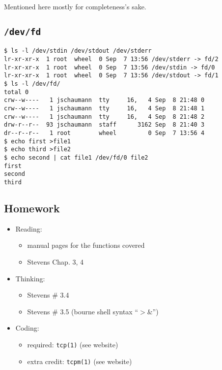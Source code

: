 \documentclass[xga]{xdvislides}
\begin{document}
Mentioned here mostly for completeness's sake.

\subsection{{\tt /dev/fd}}
\begin{verbatim}
$ ls -l /dev/stdin /dev/stdout /dev/stderr
lr-xr-xr-x  1 root  wheel  0 Sep  7 13:56 /dev/stderr -> fd/2
lr-xr-xr-x  1 root  wheel  0 Sep  7 13:56 /dev/stdin -> fd/0
lr-xr-xr-x  1 root  wheel  0 Sep  7 13:56 /dev/stdout -> fd/1
$ ls -l /dev/fd/
total 0
crw--w----   1 jschaumann  tty     16,   4 Sep  8 21:48 0
crw--w----   1 jschaumann  tty     16,   4 Sep  8 21:48 1
crw--w----   1 jschaumann  tty     16,   4 Sep  8 21:48 2
drw-r--r--  93 jschaumann  staff      3162 Sep  8 21:40 3
dr--r--r--   1 root        wheel         0 Sep  7 13:56 4
$ echo first >file1
$ echo third >file2
$ echo second | cat file1 /dev/fd/0 file2
first
second
third
\end{verbatim}


\subsection{Homework}
\begin{itemize}
	\item Reading:
		\begin{itemize}
			\item manual pages for the functions covered
			\item Stevens Chap. 3, 4
		\end{itemize}
	\item Thinking:
		\begin{itemize}
			\item Stevens \# 3.4
			\item Stevens \# 3.5 (bourne shell syntax ``$>\&$'')
		\end{itemize}
	\item Coding:
		\begin{itemize}
			\item required: {\tt tcp(1)} (see website)
			\item extra credit: {\tt tcpm(1)} (see website)
		\end{itemize}
\end{itemize}
\end{document}
